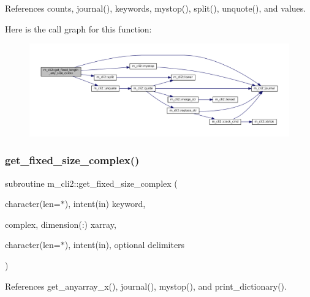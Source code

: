References counts, journal(), keywords, mystop(), split(), unquote(), and values.

Here is the call graph for this function\+:
\nopagebreak
\begin{figure}[H]
\begin{center}
\leavevmode
\includegraphics[width=350pt]{namespacem__cli2_abc31389c45dcd95b8db641b59b98b447_cgraph}
\end{center}
\end{figure}
\mbox{\label{namespacem__cli2_a32b78784e20e29bf40f17e16d08336fa}} 
\subsubsection{\texorpdfstring{get\+\_\+fixed\+\_\+size\+\_\+complex()}{get\_fixed\_size\_complex()}}
{\footnotesize\ttfamily subroutine m\+\_\+cli2\+::get\+\_\+fixed\+\_\+size\+\_\+complex (\begin{DoxyParamCaption}\item[{character(len=$\ast$), intent(in)}]{keyword,  }\item[{complex, dimension(\+:)}]{xarray,  }\item[{character(len=$\ast$), intent(in), optional}]{delimiters }\end{DoxyParamCaption})\hspace{0.3cm}{\ttfamily [private]}}



References get\+\_\+anyarray\+\_\+x(), journal(), mystop(), and print\+\_\+dictionary().

